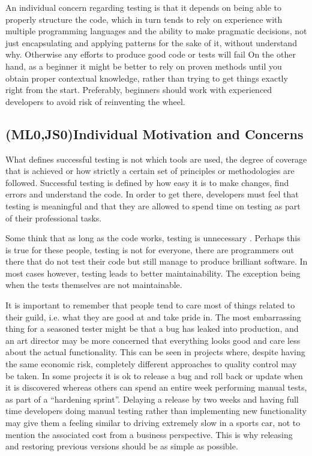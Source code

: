 \documentclass[11pt]{article}
\begin{document}
An individual concern regarding testing is that it depends on being able to properly structure the code, which in turn tends to rely on experience with multiple programming languages and the ability to make pragmatic decisions, not just encapsulating and applying patterns for the sake of it, without understand why. Otherwise any efforts to produce good code or tests will fail %
On the other hand, as a beginner it might be better to rely on proven methods until you obtain proper contextual knowledge, rather than trying to get things exactly right from the start. Preferably, beginners should work with experienced developers to avoid risk of reinventing the wheel. \cite[questions~23-24]{Ahnve}


\subsection{(ML0,JS0)Individual Motivation and Concerns}
\label{subsec:motivationconcerns}

What defines successful testing is not which tools are used, the degree of coverage that is achieved or how strictly a certain set of principles or methodologies are followed. Successful testing is defined by how easy it is to make changes, find errors and understand the code. In order to get there, developers must feel that testing is meaningful and that they are allowed to spend time on testing as part of their professional tasks.

Some think that as long as the code works, testing is unnecessary \cite[question~13]{Ahnve}. Perhaps this is true for these people, testing is not for everyone, there are programmers out there that do not test their code but still manage to produce brilliant software. In most cases however, testing leads to better maintainability. The exception being when the tests themselves are not maintainable. \cite[question~33]{Ahnve}\cite[question~28]{Edelstam}

It is important to remember that people tend to care most of things related to their guild, i.e. what they are good at and take pride in. The most embarrassing thing for a seasoned tester might be that a bug has leaked into production, and an art director may be more concerned that everything looks good and care less about the actual functionality. This can be seen in projects where, despite having the same economic risk, completely different approaches to quality control may be taken. In some projects it is ok to release a bug and roll back or update when it is discovered whereas others can spend an entire week performing manual tests, as part of a ``hardening sprint''. Delaying a release by two weeks and having full time developers doing manual testing rather than implementing new functionality may give them a feeling similar to driving extremely slow in a sports car, not to mention the associated cost from a business perspective. This is why releasing and restoring previous versions should be as simple as possible. \cite[question~38]{Ahnve}
\end{document}
